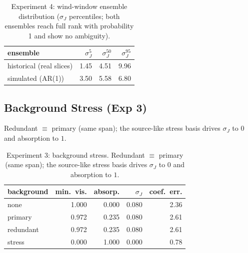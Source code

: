 \begin{table}[t]
\centering
\footnotesize
\caption{Experiment 4: wind-window ensemble distribution ($\sigma_J$ percentiles;
both ensembles reach full rank with probability 1 and show no ambiguity).}
\label{tab:results_h4_ens}
\begin{tabular}{lrrr}
\toprule
ensemble & $\sigma_J^{5}$ & $\sigma_J^{50}$ & $\sigma_J^{95}$ \\
\midrule
historical (real slices) & 1.45 & 4.51 & 9.96 \\
simulated (AR(1))        & 3.50 & 5.58 & 6.80 \\
\bottomrule
\end{tabular}
\end{table}

\subsection{Background Stress (Exp 3)}
Redundant $\equiv$ primary (same span); the source-like stress basis drives
$\sigma_J$ to $0$ and absorption to $1$.
\begin{table}[t]
\centering
\footnotesize
\caption{Experiment 3: background stress. Redundant $\equiv$ primary (same span);
the source-like stress basis drives $\sigma_J$ to $0$ and absorption to $1$.}
\label{tab:results_h3}
\begin{tabular}{lrrrr}
\toprule
background & min.\ vis. & absorp. & $\sigma_J$ & coef.\ err. \\
\midrule
none      & 1.000 & 0.000 & 0.080 & 2.36 \\
primary   & 0.972 & 0.235 & 0.080 & 2.61 \\
redundant & 0.972 & 0.235 & 0.080 & 2.61 \\
stress    & 0.000 & 1.000 & 0.000 & 0.78 \\
\bottomrule
\end{tabular}
\end{table}

